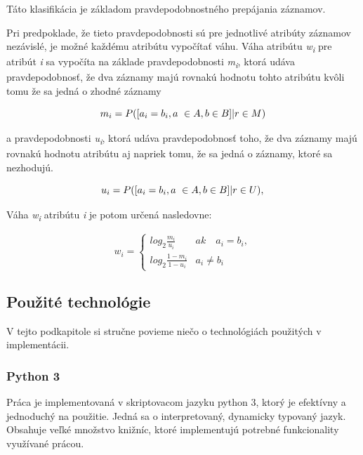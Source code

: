 Táto klasifikácia je základom pravdepodobnostného prepájania záznamov.

Pri predpoklade, že tieto pravdepodobnosti sú pre jednotlivé atribúty záznamov nezávislé, je
možné každému atribútu vypočítať váhu. Váha atribútu \textit{w\textsubscript{i}} pre atribút \textit{i} sa vypočíta na
základe pravdepodobnosti \textit{m\textsubscript{i}}, ktorá udáva pravdepodobnosť, že dva záznamy majú rovnakú
hodnotu tohto atribútu kvôli tomu že sa jedná o zhodné záznamy

\begin{equation*}
m_i = P ([a_i = b_i, a~\in A, b \in B] | r\in M) \\
\end{equation*}

a pravdepodobnosti \textit{u\textsubscript{i}}, ktorá udáva pravdepodobnosť toho, že dva záznamy majú rovnakú hodnotu atribútu aj napriek tomu, že sa jedná o záznamy, ktoré sa nezhodujú.

\begin{equation*}
u_i = P ([a_i = b_i, a~\in A, b \in B] | r \in U), \\
\end{equation*}

Váha \textit{w\textsubscript{i}} atribútu \textit{i} je potom určená nasledovne:

\begin{equation*}
    w_{i} = 
\begin{cases} log_2  \frac{ m_i}{u_i}  &  ak \quad a_i = b_i, \\
              log_2  \frac{ 1- m_i}{1 - u_i}  &  a_i \neq b_i \end{cases}
\end{equation*}

\subsection{Použité technológie}

V tejto podkapitole si stručne povieme niečo o technológiách použitých v implementácii.

\subsubsection{Python 3}
Práca je implementovaná v skriptovacom jazyku python 3, ktorý je efektívny a jednoduchý na
použitie. Jedná sa o interpretovaný, dynamicky typovaný jazyk. Obsahuje veľké množstvo
knižníc, ktoré implementujú potrebné funkcionality využívané prácou.
\newpage
